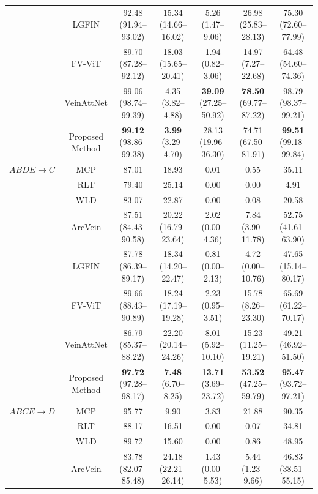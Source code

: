 \documentclass[10pt,journal,compsoc]{IEEEtran}
\begin{document}
\begin{table}[ht!]
{\begin{tabular}{|c|c|c|c|c|c|c|}
         & LGFIN \cite{lgfin} & 92.48 (91.94--93.02) & 15.34 (14.66--16.02) & 5.26 (1.47--9.06) & 26.98 (25.83--28.13) & 75.30 (72.60--77.99) \\
         & FV-ViT \cite{vit} & 89.70 (87.28--92.12) & 18.03 (15.65--20.41) & 1.94 (0.82--3.06) & 14.97 (7.27--22.68) & 64.48 (54.60--74.36) \\
         & VeinAttNet \cite{veinatnnet} & 99.06 (98.74--99.39) & 4.35 (3.82--4.88) & \textbf{39.09} (27.25--50.92) & \textbf{78.50} (69.77--87.22) & 98.79 (98.37--99.21) \\
         & Proposed Method & \textbf{99.12} (98.86--99.38) & \textbf{3.99} (3.29--4.70) & 28.13 (19.96--36.30) & 74.71 (67.50--81.91) & \textbf{99.51} (99.18--99.84) \\
        \hline
        $ABDE \rightarrow C$ & MCP \cite{mcp} & 87.01 & 18.93 & 0.01 & 0.55 & 35.11 \\
         & RLT \cite{rlt} & 79.40 & 25.14 & 0.00 & 0.00 & 4.91 \\
         & WLD \cite{wld} & 83.07 & 22.87 & 0.00 & 0.08 & 20.58 \\
         & ArcVein \cite{arcvein} & 87.51 (84.43--90.58) & 20.22 (16.79--23.64) & 2.02 (0.00--4.36) & 7.84 (3.90--11.78) & 52.75 (41.61--63.90) \\
         & LGFIN \cite{lgfin} & 87.78 (86.39--89.17) & 18.34 (14.20--22.47) & 0.81 (0.00--2.13) & 4.72 (0.00--10.76) & 47.65 (15.14--80.17) \\
         & FV-ViT \cite{vit} & 89.66 (88.43--90.89) & 18.24 (17.19--19.28) & 2.23 (0.95--3.51) & 15.78 (8.26--23.30) & 65.69 (61.22--70.17) \\
         & VeinAttNet \cite{veinatnnet} & 86.79 (85.37--88.22) & 22.20 (20.14--24.26) & 8.01 (5.92--10.10) & 15.23 (11.25--19.21) & 49.21 (46.92--51.50) \\
         & Proposed Method & \textbf{97.72} (97.28--98.17) & \textbf{7.48} (6.70--8.25) & \textbf{13.71} (3.69--23.72) & \textbf{53.52} (47.25--59.79) & \textbf{95.47} (93.72--97.21) \\
        \hline
        $ABCE \rightarrow D$ & MCP \cite{mcp} & 95.77 & 9.90 & 3.83 & 21.88 & 90.35 \\
         & RLT \cite{rlt} & 88.17 & 16.51 & 0.00 & 0.07 & 34.81 \\
         & WLD \cite{wld} & 89.72 & 15.60 & 0.00 & 0.86 & 48.95 \\
         & ArcVein \cite{arcvein} & 83.78 (82.07--85.48) & 24.18 (22.21--26.14) & 1.43 (0.00--5.53) & 5.44 (1.23--9.66) & 46.83 (38.51--55.15) \\

\end{tabular}}
\end{table}
\end{document}
